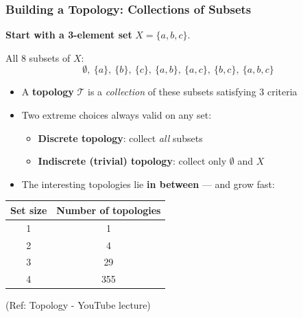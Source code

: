 \begin{frame}[fragile]\frametitle{Building a Topology: Collections of Subsets}

\textbf{Start with a 3-element set} $X = \{a, b, c\}$.

All 8 subsets of $X$:
\[
\emptyset,\ \{a\},\ \{b\},\ \{c\},\ \{a,b\},\ \{a,c\},\ \{b,c\},\ \{a,b,c\}
\]

\begin{itemize}
  \item A \textbf{topology} $\mathcal{T}$ is a \emph{collection} of these subsets satisfying 3 criteria
  \item Two extreme choices always valid on any set:
    \begin{itemize}
      \item \textbf{Discrete topology}: collect \emph{all} subsets
      \item \textbf{Indiscrete (trivial) topology}: collect only $\emptyset$ and $X$
    \end{itemize}
  \item The interesting topologies lie \textbf{in between} --- and grow fast:
\end{itemize}

\vspace{0.1cm}
\begin{center}
\begin{tabular}{cc}
\hline
\textbf{Set size} & \textbf{Number of topologies} \\
\hline
1 & 1 \\
2 & 4 \\
3 & 29 \\
4 & 355 \\
\hline
\end{tabular}
\end{center}

{\tiny (Ref: Topology - YouTube lecture)}
\end{frame}

